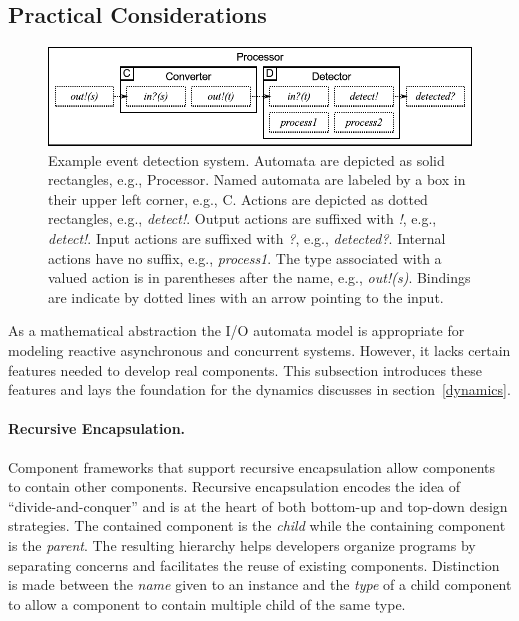 \subsection{Practical Considerations}

\begin{figure}
\center
\includegraphics[width=\textwidth]{system_model}
\caption{Example event detection system.
  Automata are depicted as solid rectangles, e.g., Processor.
  Named automata are labeled by a box in their upper left corner, e.g., C.
  Actions are depicted as dotted rectangles, e.g., \emph{detect!}.
  Output actions are suffixed with \emph{!}, e.g., \emph{detect!}.
  Input actions are suffixed with \emph{?}, e.g., \emph{detected?}.
  Internal actions have no suffix, e.g., \emph{process1}.
  The type associated with a valued action is in parentheses after the name, e.g., \emph{out!(s)}.
  Bindings are indicate by dotted lines with an arrow pointing to the input.}
\label{sys_model}
\end{figure}

As a mathematical abstraction the I/O automata model is appropriate for modeling reactive asynchronous and concurrent systems.
However, it lacks certain features needed to develop real components.
This subsection introduces these features and lays the foundation for the dynamics discusses in section~\ref{dynamics}.

\paragraph{Recursive Encapsulation.}
Component frameworks that support recursive encapsulation allow components to contain other components.
Recursive encapsulation encodes the idea of ``divide-and-conquer'' and is at the heart of both bottom-up and top-down design strategies.
The contained component is the \emph{child} while the containing component is the \emph{parent}.
The resulting hierarchy helps developers organize programs by separating concerns and facilitates the reuse of existing components.
Distinction is made between the \emph{name} given to an instance and the \emph{type} of a child component to allow a component to contain multiple child of the same type.


